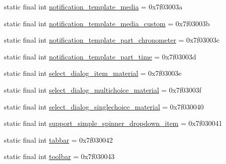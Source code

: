 \begin{CompactItemize}
\item 
static final int \hyperlink{classandroid_1_1support_1_1v7_1_1palette_1_1_r_1_1layout_3e11606f777486458960f873dc16bc64}{notification\_\-template\_\-media} = 0x7f03003a
\item 
static final int \hyperlink{classandroid_1_1support_1_1v7_1_1palette_1_1_r_1_1layout_1df4219114973853a7534b9ceb94c797}{notification\_\-template\_\-media\_\-custom} = 0x7f03003b
\item 
static final int \hyperlink{classandroid_1_1support_1_1v7_1_1palette_1_1_r_1_1layout_bb7e2fee62ef6d2759b2b8ecc75ff921}{notification\_\-template\_\-part\_\-chronometer} = 0x7f03003c
\item 
static final int \hyperlink{classandroid_1_1support_1_1v7_1_1palette_1_1_r_1_1layout_456b15a40b2733e5d58e6db338019034}{notification\_\-template\_\-part\_\-time} = 0x7f03003d
\item 
static final int \hyperlink{classandroid_1_1support_1_1v7_1_1palette_1_1_r_1_1layout_7afb14446d9e17da3caea70654106b8d}{select\_\-dialog\_\-item\_\-material} = 0x7f03003e
\item 
static final int \hyperlink{classandroid_1_1support_1_1v7_1_1palette_1_1_r_1_1layout_f3d433eb80020c0728e491f266d6eeb0}{select\_\-dialog\_\-multichoice\_\-material} = 0x7f03003f
\item 
static final int \hyperlink{classandroid_1_1support_1_1v7_1_1palette_1_1_r_1_1layout_2f8bbd0be203bc48610463d0d0377168}{select\_\-dialog\_\-singlechoice\_\-material} = 0x7f030040
\item 
static final int \hyperlink{classandroid_1_1support_1_1v7_1_1palette_1_1_r_1_1layout_f570c26a7ef0320507cc36610b0ad101}{support\_\-simple\_\-spinner\_\-dropdown\_\-item} = 0x7f030041
\item 
static final int \hyperlink{classandroid_1_1support_1_1v7_1_1palette_1_1_r_1_1layout_e2487a96b5af387b648eeab188739d01}{tabbar} = 0x7f030042
\item 
static final int \hyperlink{classandroid_1_1support_1_1v7_1_1palette_1_1_r_1_1layout_935f3b011c54688b7728f87369cbb105}{toolbar} = 0x7f030043
\end{CompactItemize}


